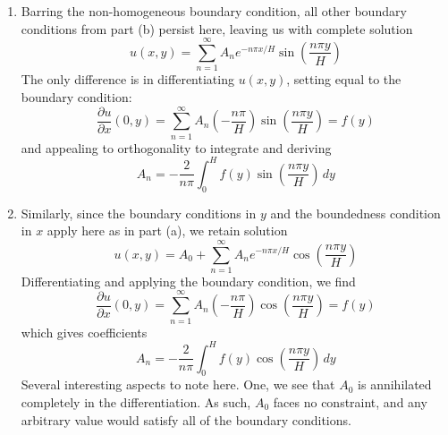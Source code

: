 \documentclass[a4paper]{article}
\begin{document}
\begin{enumerate}[label=(\alph*)]
\[	\]
	Our eigenfunctions to our eigenvalue are
	\begin{center}
		\renewcommand{\arraystretch}{1.8}
		\setlength{\arraycolsep}{10pt}
		\begin{tabular}{|c||c|}
			\hline
			\rule[-1.2em]{0pt}{3em}
			 & \( \lambda_{n} = \!\left( \dfrac{n \pi}{H} \right)^{2} > 0 \) \\
			\hline\hline
			\rule[-1.2em]{0pt}{3em}
					\( F \!\left( x \right) \) & \( e^{-n \pi x / H} \) \\
			\hline
			\rule[-1.2em]{0pt}{3em}
					\( G \!\left( y \right) \) & \( \sin\!\left(\dfrac{n \pi y}{H}\right) \) \\
			\hline
		\end{tabular}
	\end{center}
	which form complete solution
	\[
		u \!\left( x,y \right) = \sum^{\infty}_{n=1} A_{n}e^{-n \pi x / H}\sin\!\left(\frac{n \pi y}{H}\right) 
	\]
	with coefficients
	\[
		A_{n} = \frac{2}{H}\int^{H}_{0} f \!\left( y \right)\sin\!\left(\frac{n \pi y}{H}\right) \, dy, \quad n \ge 1
	\]
	Notice that we have no \( A_{0} \), as when \( \lambda = 0 \), we receive only the trivial solution, so it turns out that \( \lambda = 0 \) is not an eigenvalue at all. Thus \( n = 0 \) fails to be a mode in this problem.
	\item Barring the non-homogeneous boundary condition, all other boundary conditions from part (b) persist here, leaving us with complete solution
	\[
		u \!\left( x,y \right) = \sum^{\infty}_{n=1} A_{n}e^{-n \pi x / H}\sin\!\left(\frac{n \pi y}{H}\right) 
	\]
	The only difference is in differentiating \( u \!\left( x,y \right) \), setting equal to the boundary condition:
	\[
		\frac{\partial u}{\partial x}\!\left( 0,y \right) = \sum^{\infty}_{n=1} A_{n}\!\left( -\frac{n \pi}{H} \right)\sin\!\left(\frac{n \pi y}{H}\right) = f \!\left( y \right) 
	\]and appealing to orthogonality to integrate and deriving
	\[
		A_{n} = -\frac{2}{n \pi}\int^{H}_{0} f \!\left( y \right)\sin\!\left(\frac{n 
	\pi y}{H}\right) \, dy  
	\]
	\item Similarly, since the boundary conditions in \( y \) and the boundedness condition in \( x \) apply here as in part (a), we retain solution
	\[
		u \!\left( x,y \right) = A_{0} + \sum^{\infty}_{n=1} A_{n}e^{-n \pi x / H} \cos\!\left(\frac{n \pi y}{H}\right)
	\]
	Differentiating and applying the boundary condition, we find
	\[
		\frac{\partial u}{\partial x}\!\left( 0,y \right) = \sum^{\infty}_{n=1} A_{n}\!\left( -\frac{n \pi}{H} \right)\cos\!\left(\frac{n \pi y}{H}\right) = f \!\left( y \right) 
	\]
	which gives coefficients
	\[
		A_{n} = -\frac{2}{n \pi}\int^{H}_{0} f \!\left( y \right)\cos\!\left(\frac{n \pi y}{H}\right) \, dy  
	\]
	Several interesting aspects to note here. One, we see that \( A_{0} \) is annihilated completely in the differentiation. As such, \( A_{0} \) faces no constraint, and any arbitrary value would satisfy all of the boundary conditions. 


\end{enumerate}
\end{document}
